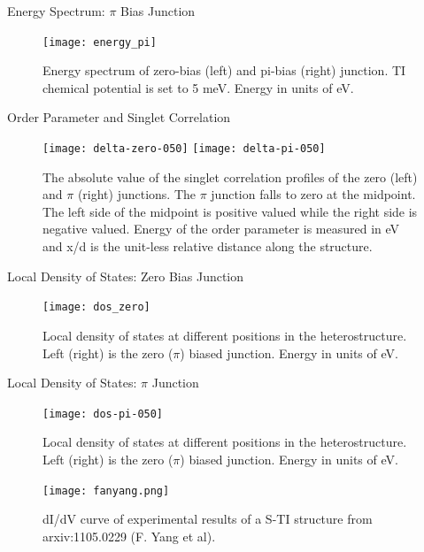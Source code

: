 \documentclass[]{beamer}
\begin{document}
\begin{frame}{Energy Spectrum: $\pi$ Bias Junction}

\begin{figure}[h]
\texttt{[image: energy\_pi]}
\caption{Energy spectrum of zero-bias (left) and pi-bias (right) junction. TI chemical potential is set to 5 meV. Energy in units of eV.
}\label{jj-energy}
\end{figure}
\end{frame}  


\begin{frame}{Order Parameter and Singlet Correlation}


\begin{figure}
\texttt{[image: delta-zero-050]}
\texttt{[image: delta-pi-050]}
\caption{The absolute value of the singlet correlation profiles of the zero (left) and $\pi$ (right) junctions. The $\pi$ junction falls to zero at the midpoint. The left side of the midpoint is positive valued while the right side is negative valued. Energy of the order parameter is measured in eV and x/d is the unit-less relative distance along the structure.
}\label{order}
\end{figure}

\clearpage

\end{frame}  

\begin{frame}{Local Density of States: Zero Bias Junction}

\begin{figure}
\texttt{[image: dos\_zero]}
\caption{Local density of states at different positions in the heterostructure. Left (right) is the zero ($\pi$) biased junction. Energy in units of eV.
}\label{ldos-jj}
\end{figure}
\end{frame}

\begin{frame}{Local Density of States: $\pi$ Junction}

\begin{figure}
\texttt{[image: dos-pi-050]}
\caption{Local density of states at different positions in the heterostructure. Left (right) is the zero ($\pi$) biased junction. Energy in units of eV.
}\label{ldos-jj}
\end{figure}

\end{frame}

\begin{frame}{}

\begin{figure}[h]
\center
\texttt{[image: fanyang.png]}
\caption{dI/dV curve of experimental results of a S-TI structure from arxiv:1105.0229 (F. Yang et al).
}\label{fanyang}
\end{figure}

\clearpage
\end{frame}  
\end{document}
